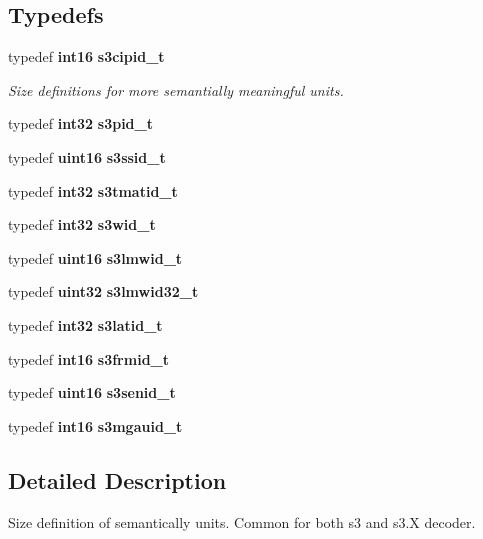 \subsection*{\-Typedefs}
\begin{DoxyCompactItemize}
\item 
typedef {\bf int16} {\bf s3cipid\-\_\-t}
\begin{DoxyCompactList}\small\item\em \-Size definitions for more semantially meaningful units. \end{DoxyCompactList}\item 
typedef {\bf int32} {\bfseries s3pid\-\_\-t}\label{s3types_8h_ace0794ef7ba6d215e2688832216771b8}

\item 
typedef {\bf uint16} {\bfseries s3ssid\-\_\-t}\label{s3types_8h_afa911acbebf09269bbc7b6821aee9c1d}

\item 
typedef {\bf int32} {\bfseries s3tmatid\-\_\-t}\label{s3types_8h_a6a7df1b2c1909fbe51979dac693549c0}

\item 
typedef {\bf int32} {\bfseries s3wid\-\_\-t}\label{s3types_8h_a1d7fc272539abdf946c1074f9ec9a71c}

\item 
typedef {\bf uint16} {\bfseries s3lmwid\-\_\-t}\label{s3types_8h_a89e3ea581c1da1df174ab36e26fc4786}

\item 
typedef {\bf uint32} {\bfseries s3lmwid32\-\_\-t}\label{s3types_8h_a7f1f08f03cf077a12500eabc6f6c509c}

\item 
typedef {\bf int32} {\bfseries s3latid\-\_\-t}\label{s3types_8h_ad0b520b3256061b8113b5bd347af8351}

\item 
typedef {\bf int16} {\bfseries s3frmid\-\_\-t}\label{s3types_8h_a29b7bbfa3ed1d10a94ecf682e05458ae}

\item 
typedef {\bf uint16} {\bfseries s3senid\-\_\-t}\label{s3types_8h_a81dd5c138da323d5305623c1ce123593}

\item 
typedef {\bf int16} {\bfseries s3mgauid\-\_\-t}\label{s3types_8h_a8bfa16957530ae6c95f3354a3f24ab5d}

\end{DoxyCompactItemize}


\subsection{\-Detailed \-Description}
\-Size definition of semantically units. \-Common for both s3 and s3.\-X decoder. 


